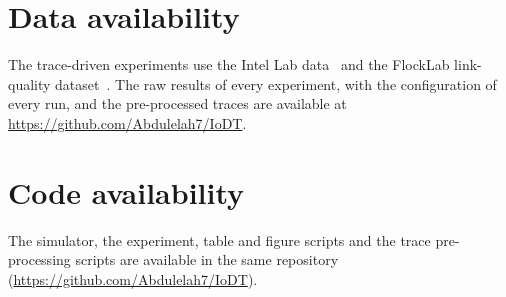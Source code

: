 \documentclass[lineno,pdflatex,sn-nature]{sn-jnl}
\theoremstyle{thmstyleone}%
\theoremstyle{thmstylethree}%
\begin{document}
\backmatter

\section*{Data availability}

The trace-driven experiments use the Intel Lab data~\cite{bodik2004intel}
and the FlockLab link-quality dataset~\cite{jacob2019flocklab}.
The raw results of every
experiment, with the configuration of every run, and the pre-processed
traces are available at \url{https://github.com/Abdulelah7/IoDT}.

\section*{Code availability}

The simulator, the experiment, table and figure scripts and the trace
pre-processing scripts are available in the same repository
(\url{https://github.com/Abdulelah7/IoDT}).
\end{document}
